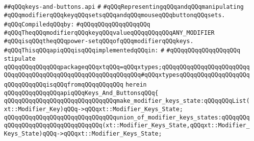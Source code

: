 \label{src/lib/x-kit/xclient/src/wire/keys-and-buttons.api}
\verb|##qQQqkeys-and-buttons.api|\newline
\verb|#|\newline
\verb|#qQQqRepresentingqQQqandqQQqmanipulating|\newline
\verb|#qQQqmodifierqQQqkeyqQQqsetsqQQqandqQQqmouseqQQqbuttonqQQqsets.|\newline
\newline
\verb|#qQQqCompiledqQQqby:|\newline
\verb|#qQQqqQQqqQQqqQQqqQQq|\newline
\newline
\newline
\newline
\verb|#qQQqTheqQQqmodifierqQQqkeyqQQqvalueqQQqqQQqqQQqANY_MODIFIER|\newline
\verb|#qQQqisqQQqtheqQQqpower-setqQQqofqQQqmodifierqQQqkeys.|\newline
\newline
\verb|#qQQqThisqQQqapiqQQqisqQQqimplementedqQQqin:|\newline
\verb|#|\newline
\verb|#qQQqqQQqqQQqqQQqqQQq|\newline
\newline
\verb|stipulate|\newline
\verb|qQQqqQQqqQQqqQQqpackageqQQqxtqQQq=qQQqxtypes;qQQqqQQqqQQqqQQqqQQqqQQqqQQqqQQqqQQqqQQqqQQqqQQqqQQqqQQqqQQqqQQq#qQQqxtypesqQQqqQQqqQQqqQQqqQQqqQQqqQQqqQQqisqQQqfromqQQqqQQqqQQq|\newline
\verb|herein|\newline
\newline
\verb|qQQqqQQqqQQqqQQqapiqQQqKeys_And_ButtonsqQQq{|\newline
\newline
\verb|qQQqqQQqqQQqqQQqqQQqqQQqqQQqqQQqmake_modifier_keys_state:qQQqqQQqList(xt::Modifier_Key)qQQq->qQQqxt::Modifier_Keys_State;|\newline
\newline
\verb|qQQqqQQqqQQqqQQqqQQqqQQqqQQqqQQqunion_of_modifier_keys_states:qQQqqQQqqQQqqQQqqQQqqQQqqQQqqQQqqQQq(xt::Modifier_Keys_State,qQQqxt::Modifier_Keys_State)qQQq->qQQqxt::Modifier_Keys_State;|\newline
